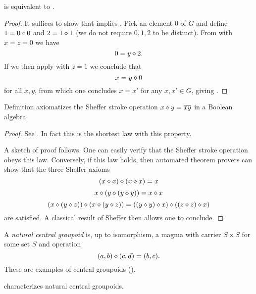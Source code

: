 \begin{theorem}[953 is equivalent to 2]\label{953_equiv_2}\leanok  {} is equivalent to .
\end{theorem}

\begin{proof}\leanok  It suffices to show that  implies .  Pick an element $0$ of $G$ and define $1 = 0 \diamond 0$ and $2 = 1 \diamond 1$ (we do not require $0,1,2$ to be distinct).
From  with $x=z=0$ we have
$$ 0 = y \diamond 2.$$
If we then apply  with $z=1$ we conclude that
$$ x = y \diamond 0$$
for all $x,y$, from which one concludes $x=x'$ for any $x,x' \in G$, giving .
\end{proof}


\begin{theorem}\label{sheffer}\leanok  Definition 
axiomatizes the Sheffer stroke operation $x \diamond y = \overline{xy}$ in a Boolean algebra.
\end{theorem}

\begin{proof}\leanok
See \cite{mccune_et_al}.  In fact this is the shortest law with this property.

A sketch of proof follows.  One can easily verify that the Sheffer stroke operation obeys this law.  Conversely, if this law holds, then automated theorem provers can show that the three Sheffer axioms
$$ (x \diamond x) \diamond (x \diamond x)  = x$$
$$ x \diamond (y \diamond (y \diamond y)) = x \diamond x$$
$$ (x \diamond (y \diamond z)) \diamond (x \diamond (y \diamond z)) = ((y \diamond y) \diamond x) \diamond ((z \diamond z) \diamond x)$$
are satisfied.  A classical result of Sheffer \cite{sheffer} then allows one to conclude.
\end{proof}

A \emph{natural central groupoid} is, up to isomorphism, a magma with carrier $S \times S$ for some set $S$ and operation
$$ (a,b) \diamond (c,d) = (b,c).$$
These are examples of central groupoids ().

\begin{theorem}\label{natural-central-groupoid}  characterizes natural central groupoids.
\end{theorem}

